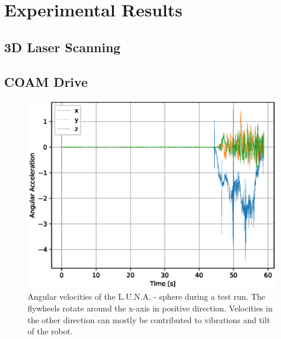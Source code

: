 \section{Experimental Results}
\label{sec:experimentalResults}


\subsection{3D Laser Scanning}
\label{sec:experimentalResults:3DLaserScanning}



\subsection{COAM Drive}
\label{sec:experimentalResults:COAMDrive}

\begin{figure}
\centering
\includegraphics[width=\textwidth]{./plotsAndScripts/angVel-2020-01-29-16-14-54/ang-vel}
\caption{Angular velocities of the L.U.N.A. - sphere during a test run. The flywheels rotate around the x-axis in positive direction. Velocities in the other direction can mostly be contributed to vibrations and tilt of the robot.}
\label{sec:experimentalResults:COAMDrive:fig:angvel}
\end{figure}